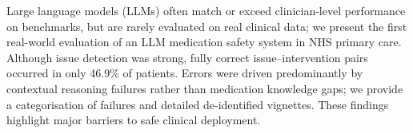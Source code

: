 Large language models (LLMs) often match or exceed clinician-level performance on benchmarks, but are rarely evaluated on real clinical data; we present the first real-world evaluation of an LLM medication safety system in NHS primary care. Although issue detection was strong, fully correct issue–intervention pairs occurred in only 46.9\% of  patients. Errors were driven predominantly by contextual reasoning failures rather than medication knowledge gaps; we provide a categorisation of failures and detailed de-identified vignettes. These findings highlight major barriers to safe clinical deployment.